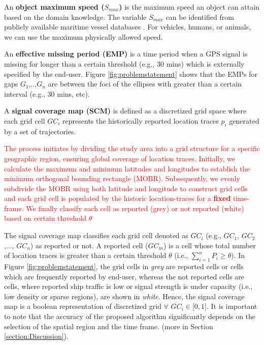 \documentclass[acmsmall]{acmart}
\begin{document}
\begin{definition}
An \textbf{object maximum speed ($S_{max}$)} is the maximum speed an object can attain based on the domain knowledge. The variable $S_{max}$ can be identified from publicly available maritime vessel databases \cite{aisdataUS}. For vehicles, humans, or animals, we can use the maximum physically allowed speed.
\end{definition}

\begin{definition}
An \textbf{effective missing period (EMP)} is a time period when a GPS signal is missing for longer than a certain threshold (e.g., 30 mins) which is externally specified by the end-user. Figure \ref{fig:problemstatement} shows that the EMPs for gaps $G_{1}$,..,$G_{n}$ are between the foci of the ellipses with greater than a certain interval (e.g., 30 mins, etc).
\end{definition}

\begin{definition}
A \textbf{signal coverage map (SCM)} is defined as a discretized grid space where each grid cell $GC_{i}$ represents the historically reported location traces $p_{i}$ generated by a set of trajectories.
\end{definition}

\textcolor{red}{The process initiates by dividing the study area into a grid structure for a specific geographic region, ensuring global coverage of location traces. Initially, we calculate the maximum and minimum latitudes and longitudes to establish the minimum orthogonal bounding rectangle (MOBR). Subsequently, we evenly subdivide the MOBR using both latitude and longitude to construct grid cells and each grid cell is populated by the historic location-traces for a \textbf{fixed} time-frame. We finally classify each cell as reported (grey) or not reported (white) based on certain threshold $\theta$}

The signal coverage map classifies each grid cell denoted as $GC_{i}$ (e.g., $GC_{1}$, $GC_{2}$,..., $GC_{n}$) as reported or not. A reported cell ($GC_{m}$) is a cell whose total number of location traces is greater than a certain threshold $\theta$ (i.e., $\sum_{i=1}^{n} P_{i} \geq \theta$). In Figure \ref{fig:problemstatement}, the grid cells in \textit{grey} are reported cells or cells which are frequently reported by end-user, whereas the not reported cells are cells, where reported ship traffic is low or signal strength is under capacity (i.e., low density or sparse regions), are shown in \textit{white}. Hence, the signal coverage map is a boolean representation of discretized grid $\forall$ $GC_{i} \in \lbrack0,1\rbrack$.  It is important to note that the accuracy of the proposed algorithm significantly depends on the selection of the spatial region and the time frame. (more in Section \ref{section:Discussion}).
\end{document}
